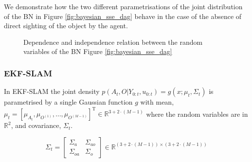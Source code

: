 We demonstrate how the two different parametrisations of the joint distribution of the BN in Figure \ref{fig:bayesian_sse_dag} 
behave in the case of the absence of direct sighting of the object by the agent.

\begin{figure}
\centering
{}%
\caption{Dependence and independence relation between the random variables of the BN Figure \ref{fig:bayesian_sse_dag}}
 \label{fig:ch5_dseperation}
\end{figure}



\subsubsection{EKF-SLAM}\label{sec:EKF-SLAM}

In EKF-SLAM the joint density $p(A_{t},O|Y_{0:t},u_{0:t}) = g(x;\mu_t,\Sigma_t)$ is parametrised by a single Gaussian function $g$ with mean,
$\mu_t = \left[\mu_{A_{t}},\mu_{O^{(1)}},\dots,\mu_{O^{(M-1)}}\right]^{\mathrm{T}} \in \mathbb{R}^{3 + 2\cdot (M-1)}$  where the random variables 
are in $\mathbb{R}^2$, and covariance, $\Sigma_t$. 

\begin{equation}
\Sigma_t = \begin{bmatrix}
       \Sigma_a & \Sigma_{ao}  \\[0.3em]
       \Sigma_{oa} & \Sigma_o
     \end{bmatrix}
     \in \mathbb{R}^{(3 + 2\cdot (M-1)) \times (3 + 2\cdot (M-1))}
\end{equation}

